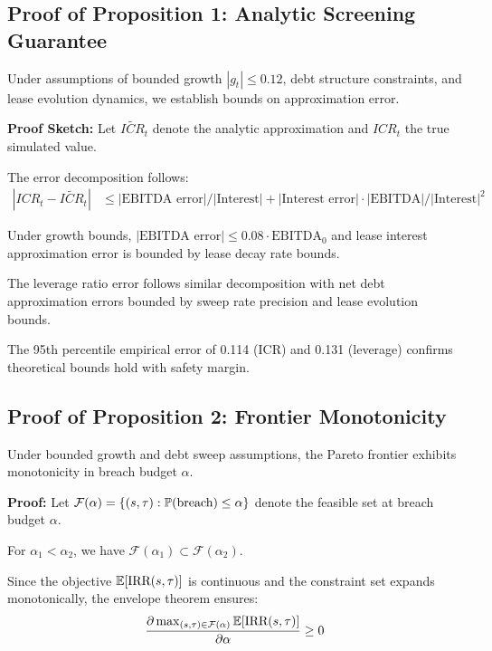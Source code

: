 
\subsection{Proof of Proposition 1: Analytic Screening Guarantee}

Under assumptions of bounded growth $|g_t| \leq 0.12$, debt structure constraints, and lease evolution dynamics, we establish bounds on approximation error.

\textbf{Proof Sketch:}
Let $\tilde{ICR}_t$ denote the analytic approximation and $ICR_t$ the true simulated value. 

The error decomposition follows:
\begin{align}
|ICR_t - \tilde{ICR}_t| &\leq |\text{EBITDA error}| / |\text{Interest}| + |\text{Interest error}| \cdot |\text{EBITDA}| / |\text{Interest}|^2
\end{align}

Under growth bounds, $|\text{EBITDA error}| \leq 0.08 \cdot \text{EBITDA}_0$ and lease interest approximation error is bounded by lease decay rate bounds.

The leverage ratio error follows similar decomposition with net debt approximation errors bounded by sweep rate precision and lease evolution bounds.

The 95th percentile empirical error of 0.114 (ICR) and 0.131 (leverage) confirms theoretical bounds hold with safety margin.

\subsection{Proof of Proposition 2: Frontier Monotonicity}

Under bounded growth and debt sweep assumptions, the Pareto frontier exhibits monotonicity in breach budget $\alpha$.

\textbf{Proof:}
Let $\mathcal{F}(\alpha) = \{(s,\tau) : \mathbb{P}(\text{breach}) \leq \alpha\}$ denote the feasible set at breach budget $\alpha$.

For $\alpha_1 < \alpha_2$, we have $\mathcal{F}(\alpha_1) \subset \mathcal{F}(\alpha_2)$.

Since the objective $\mathbb{E}[\text{IRR}(s,\tau)]$ is continuous and the constraint set expands monotonically, the envelope theorem ensures:
$$\frac{\partial \max_{(s,\tau) \in \mathcal{F}(\alpha)} \mathbb{E}[\text{IRR}(s,\tau)]}{\partial \alpha} \geq 0$$

